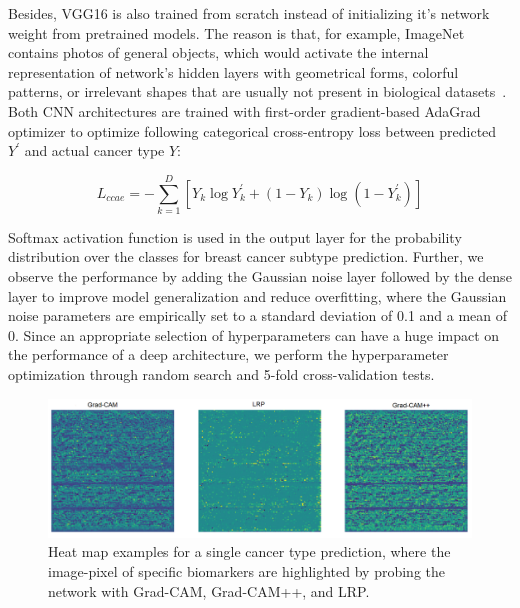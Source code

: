 \hspace*{3.5mm} Besides, VGG16 is also trained from scratch instead of initializing it's network weight from pretrained models. The reason is that, for example, ImageNet contains photos of general objects, which would activate the internal representation of network's hidden layers with geometrical forms, colorful patterns, or irrelevant shapes that are usually not present in biological datasets~\cite{Karim2020DeepCOVIDExplainer}. Both CNN architectures are trained with first-order gradient-based AdaGrad optimizer to optimize following categorical cross-entropy loss between predicted $Y^{\prime}$ and actual cancer type $Y$: 

\vspace{-2mm}
\begin{equation} 
    L_{ccae}=-\sum_{k=1}^{D}\left[Y_{k} \log Y_{k}^{\prime}+\left(1-Y_{k}\right) \log \left(1-Y_{k}^{\prime}\right)\right]
    \label{eq:cross_entropy_loss_2}
\end{equation} 

\hspace*{3.5mm} Softmax activation function is used in the output layer for the probability distribution over the classes for breast cancer subtype prediction. Further, we observe the performance by adding the Gaussian noise layer followed by the dense layer to improve model generalization and reduce overfitting, where the Gaussian noise parameters are empirically set to a standard deviation of 0.1 and a mean of 0. Since an appropriate selection of hyperparameters can have a huge impact on the performance of a deep architecture, we perform the hyperparameter optimization through random search and 5-fold cross-validation tests. 

\begin{figure}[h]
	\centering
	\includegraphics[scale=0.8]{images/3_mode.png}
	\caption{Heat map examples for a single cancer type prediction, where the image-pixel of specific biomarkers are highlighted by probing the network with Grad-CAM, Grad-CAM++, and LRP.} 
	\label{fig:3hms}
\end{figure}

